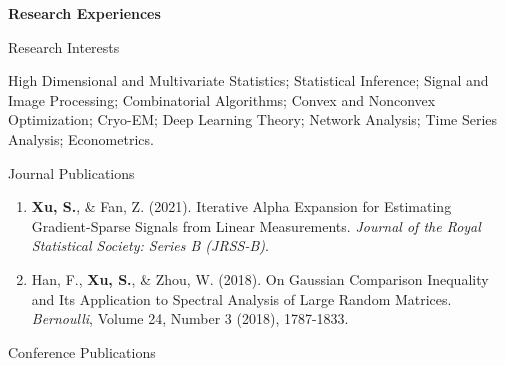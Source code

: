 \documentclass{article}
\begin{document}



\vspace{5mm}
\begin{large}
\noindent \textbf{Research Experiences}
\end{large}
\vspace{5mm}

\begin{large}
\noindent Research Interests
\end{large}

\vspace{3mm}



High Dimensional and Multivariate Statistics; Statistical Inference; Signal and Image Processing; Combinatorial Algorithms; Convex and Nonconvex Optimization; Cryo-EM; Deep Learning Theory; Network Analysis; Time Series Analysis; Econometrics.

\vspace{3mm}

\begin{large}
\noindent Journal Publications
\end{large}

\begin{enumerate}
\item \textbf{Xu, S.}, \& Fan, Z. (2021). Iterative Alpha Expansion for Estimating Gradient-Sparse Signals from Linear Measurements. \emph{Journal of the Royal Statistical Society: Series B (JRSS-B)}.
\item Han, F., \textbf{Xu, S.}, \& Zhou, W. (2018). On Gaussian Comparison Inequality and Its Application to Spectral Analysis of Large Random Matrices. \emph{Bernoulli}, Volume 24, Number 3 (2018), 1787-1833.
\end{enumerate}


\begin{large}
\noindent Conference Publications
\end{large}
\end{document}
